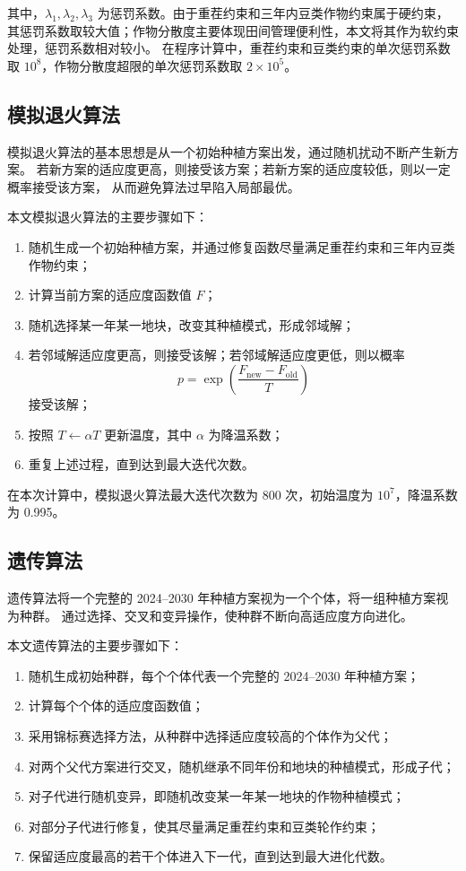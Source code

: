 \documentclass[12pt,a4paper]{ctexart}
\begin{document}
其中，$\lambda_1,\lambda_2,\lambda_3$ 为惩罚系数。由于重茬约束和三年内豆类作物约束属于硬约束，
其惩罚系数取较大值；作物分散度主要体现田间管理便利性，本文将其作为软约束处理，惩罚系数相对较小。
在程序计算中，重茬约束和豆类约束的单次惩罚系数取 $10^8$，作物分散度超限的单次惩罚系数取 $2\times 10^5$。

\subsection{模拟退火算法}

模拟退火算法的基本思想是从一个初始种植方案出发，通过随机扰动不断产生新方案。
若新方案的适应度更高，则接受该方案；若新方案的适应度较低，则以一定概率接受该方案，
从而避免算法过早陷入局部最优。

本文模拟退火算法的主要步骤如下：

\begin{enumerate}
    \item 随机生成一个初始种植方案，并通过修复函数尽量满足重茬约束和三年内豆类作物约束；
    \item 计算当前方案的适应度函数值 $F$；
    \item 随机选择某一年某一地块，改变其种植模式，形成邻域解；
    \item 若邻域解适应度更高，则接受该解；若邻域解适应度更低，则以概率
    \[
    p=\exp\left(\frac{F_{\text{new}}-F_{\text{old}}}{T}\right)
    \]
    接受该解；
    \item 按照 $T\leftarrow \alpha T$ 更新温度，其中 $\alpha$ 为降温系数；
    \item 重复上述过程，直到达到最大迭代次数。
\end{enumerate}

在本次计算中，模拟退火算法最大迭代次数为 800 次，初始温度为 $10^7$，降温系数为 0.995。

\subsection{遗传算法}

遗传算法将一个完整的 2024--2030 年种植方案视为一个个体，将一组种植方案视为种群。
通过选择、交叉和变异操作，使种群不断向高适应度方向进化。

本文遗传算法的主要步骤如下：

\begin{enumerate}
    \item 随机生成初始种群，每个个体代表一个完整的 2024--2030 年种植方案；
    \item 计算每个个体的适应度函数值；
    \item 采用锦标赛选择方法，从种群中选择适应度较高的个体作为父代；
    \item 对两个父代方案进行交叉，随机继承不同年份和地块的种植模式，形成子代；
    \item 对子代进行随机变异，即随机改变某一年某一地块的作物种植模式；
    \item 对部分子代进行修复，使其尽量满足重茬约束和豆类轮作约束；
    \item 保留适应度最高的若干个体进入下一代，直到达到最大进化代数。
\end{enumerate}
\end{document}
